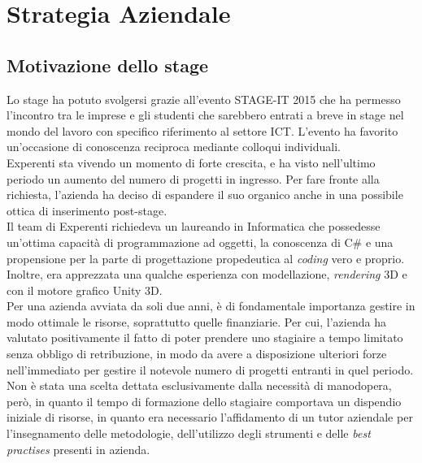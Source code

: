 \section{Strategia Aziendale}
\subsection{Motivazione dello stage}
Lo stage ha potuto svolgersi grazie all'evento STAGE-IT 2015 che ha permesso l'incontro tra le imprese e gli studenti che sarebbero entrati a breve in stage nel mondo del lavoro con specifico riferimento al settore ICT. L'evento ha favorito un'occasione di conoscenza reciproca mediante colloqui individuali.
\\
Experenti sta vivendo un momento di forte crescita, e ha visto nell'ultimo periodo un aumento del numero di progetti in ingresso. Per fare fronte alla richiesta, l'azienda ha deciso di espandere il suo organico anche in una possibile ottica di inserimento post-stage.
\\
Il team di Experenti richiedeva un laureando in Informatica che possedesse un’ottima capacità di programmazione ad oggetti, la conoscenza di C\# e una propensione per la parte di progettazione propedeutica al \textit{coding} vero e proprio.
Inoltre, era apprezzata una qualche esperienza con modellazione, \textit{rendering} 3D e con il motore grafico Unity 3D.
\\
Per una azienda avviata da soli due anni, \`e di fondamentale importanza gestire in modo ottimale le risorse, soprattutto quelle finanziarie. Per cui, l'azienda ha valutato positivamente il fatto di poter prendere uno stagiaire a tempo limitato senza obbligo di retribuzione, in modo da avere a disposizione ulteriori forze nell'immediato per gestire il notevole numero di progetti entranti in quel periodo. 
\\
Non \`e stata una scelta dettata esclusivamente dalla necessit\`a di manodopera, per\`o, in quanto il tempo di formazione dello stagiaire comportava un dispendio iniziale di risorse, in quanto era necessario l'affidamento di un tutor aziendale per l'insegnamento delle metodologie, dell'utilizzo degli strumenti e delle \textit{best practises} presenti in azienda.
